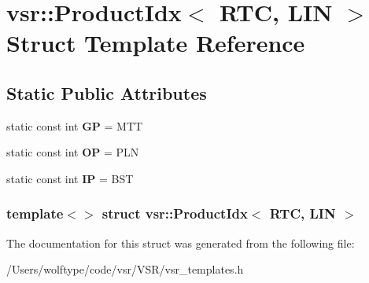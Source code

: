 \hypertarget{structvsr_1_1_product_idx_3_01_r_t_c_00_01_l_i_n_01_4}{\section{vsr\-:\-:Product\-Idx$<$ R\-T\-C, L\-I\-N $>$ Struct Template Reference}
\label{structvsr_1_1_product_idx_3_01_r_t_c_00_01_l_i_n_01_4}
}
\subsection*{Static Public Attributes}
\begin{DoxyCompactItemize}
\item 
\hypertarget{structvsr_1_1_product_idx_3_01_r_t_c_00_01_l_i_n_01_4_a81f8ff889c72b382d5721dccb0501a07}{static const int {\bfseries G\-P} = M\-T\-T}\label{structvsr_1_1_product_idx_3_01_r_t_c_00_01_l_i_n_01_4_a81f8ff889c72b382d5721dccb0501a07}

\item 
\hypertarget{structvsr_1_1_product_idx_3_01_r_t_c_00_01_l_i_n_01_4_ac6b7b8dda01c5d554901a2ff56cdadfb}{static const int {\bfseries O\-P} = P\-L\-N}\label{structvsr_1_1_product_idx_3_01_r_t_c_00_01_l_i_n_01_4_ac6b7b8dda01c5d554901a2ff56cdadfb}

\item 
\hypertarget{structvsr_1_1_product_idx_3_01_r_t_c_00_01_l_i_n_01_4_a39bd3e26a03e1275df1d405ce6694bc6}{static const int {\bfseries I\-P} = B\-S\-T}\label{structvsr_1_1_product_idx_3_01_r_t_c_00_01_l_i_n_01_4_a39bd3e26a03e1275df1d405ce6694bc6}

\end{DoxyCompactItemize}
\subsubsection*{template$<$$>$ struct vsr\-::\-Product\-Idx$<$ R\-T\-C, L\-I\-N $>$}



The documentation for this struct was generated from the following file\-:\begin{DoxyCompactItemize}
\item 
/\-Users/wolftype/code/vsr/\-V\-S\-R/vsr\-\_\-templates.\-h\end{DoxyCompactItemize}
